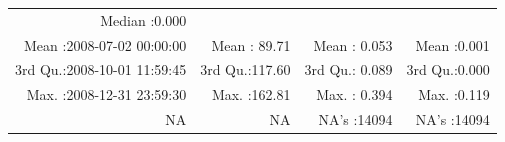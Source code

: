\documentclass[
  10pt,
  a4paper,oneside]{article}
\begin{document}
\begin{longtable}[]{@{}rrrr@{}}
\begin{minipage}[t]{0.19\columnwidth}
Median :0.000\strut
\end{minipage}\tabularnewline
\begin{minipage}[t]{0.33\columnwidth}\raggedleft
Mean :2008-07-02 00:00:00\strut
\end{minipage} & \begin{minipage}[t]{0.19\columnwidth}\raggedleft
Mean : 89.71\strut
\end{minipage} & \begin{minipage}[t]{0.19\columnwidth}\raggedleft
Mean : 0.053\strut
\end{minipage} & \begin{minipage}[t]{0.19\columnwidth}\raggedleft
Mean :0.001\strut
\end{minipage}\tabularnewline
\begin{minipage}[t]{0.33\columnwidth}\raggedleft
3rd Qu.:2008-10-01 11:59:45\strut
\end{minipage} & \begin{minipage}[t]{0.19\columnwidth}\raggedleft
3rd Qu.:117.60\strut
\end{minipage} & \begin{minipage}[t]{0.19\columnwidth}\raggedleft
3rd Qu.: 0.089\strut
\end{minipage} & \begin{minipage}[t]{0.19\columnwidth}\raggedleft
3rd Qu.:0.000\strut
\end{minipage}\tabularnewline
\begin{minipage}[t]{0.33\columnwidth}\raggedleft
Max. :2008-12-31 23:59:30\strut
\end{minipage} & \begin{minipage}[t]{0.19\columnwidth}\raggedleft
Max. :162.81\strut
\end{minipage} & \begin{minipage}[t]{0.19\columnwidth}\raggedleft
Max. : 0.394\strut
\end{minipage} & \begin{minipage}[t]{0.19\columnwidth}\raggedleft
Max. :0.119\strut
\end{minipage}\tabularnewline
\begin{minipage}[t]{0.33\columnwidth}\raggedleft
NA\strut
\end{minipage} & \begin{minipage}[t]{0.19\columnwidth}\raggedleft
NA\strut
\end{minipage} & \begin{minipage}[t]{0.19\columnwidth}\raggedleft
NA's :14094\strut
\end{minipage} & \begin{minipage}[t]{0.19\columnwidth}\raggedleft
NA's :14094\strut
\end{minipage}\tabularnewline
\bottomrule
\end{longtable}
\end{document}

